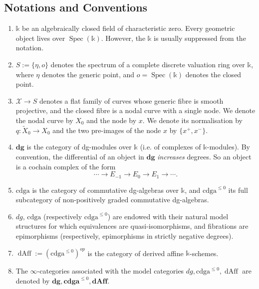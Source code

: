 \documentclass[11pt]{amsart}
\newcommand  {\dg}     {\mathbf{dg}}
\newcommand  {\cdga}     {\mathrm{cdga}}
\DeclareMathOperator{\dAffit}{dAff}
\DeclareMathOperator{\Spec}{Spec}
\theoremstyle{plain}
\numberwithin{equation}{section}
\theoremstyle{definition}
\theoremstyle{plain}
\begin{document}
\subsection{\textbf{Notations and Conventions}}
\begin{enumerate}\label{ConNot}
\item[$\bullet$] $\mathbb k$ be an algebraically closed field of characteristic zero. Every geometric object lives over $\Spec(\mathbb k)$. However, the $\mathbb k$ is usually suppressed from the notation.

\item[$\bullet$] $S:=\{\eta, o\}$ denotes the spectrum of a complete discrete valuation ring over $\mathbb k$, where $\eta$ denotes the generic point, and $o= \Spec(\mathbb k)$ denotes the closed point.

\item[$\bullet$] $\mathcal X \to S$ denotes a flat family of curves whose generic fibre is smooth projective, and the closed fibre is a nodal curve with a single node. We denote the nodal curve by $X_0$ and the node by $x$. We denote its normalisation by $q:\widetilde X_0\longrightarrow X_0$ and the two pre-images of the node $x$ by $\{x^+,x^{-}\}$. 

\item[$\bullet$] $\dg$ is the category of dg-modules over $\mathbb k$ (i.e. of
complexes of $\mathbb k$-modules). By convention, the differential of an
object in $\dg$ \emph{increases} degrees.  So an object is a cochain complex of the form \[\cdots \to E_{-1} \to E_0 \to E_1 \to \cdots. \]

\item[$\bullet$] $\cdga$ is the category of commutative dg-algebras over $\mathbb k$,
and $\cdga^{\leq 0}$ its full subcategory of non-positively graded
commutative dg-algebras.

\item[$\bullet$] $dg$, $\cdga$ (respectively $\cdga^{\leq 0}$) are
  endowed with their natural model structures for which equivalences
  are quasi-isomorphisms, and fibrations are epimorphisms
  (respectively, epimorphisms in strictly negative degrees).

\item[$\bullet$] ${\dAffit}:=(\cdga^{\leq 0})^{op}$ is the category of derived affine $\mathbb k$-schemes.


\item[$\bullet$] The $\infty$-categories associated with the model categories $dg, \cdga^{\leq0}, \dAffit$ are denoted by $\textbf{dg}, \textbf{cdga}^{\leq0}, \textbf{dAff} $.


\end{enumerate}
\end{document}
